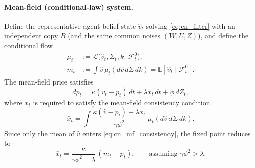 \paragraph{Mean-field (conditional-law) system.}
Define the representative-agent belief state $\hat v_t$ solving \eqref{eq:cn_filter} with an independent copy
$B$ (and the same common noises $(W,U,Z)$), and define the conditional flow
\[
\begin{aligned}
\mu_t &:= \mathcal L\bigl(\hat v_t,\Sigma_t,k \,\big|\, \mathcal F^0_t\bigr),\\
m_t &:= \int \hat v\,\mu_t(d\hat v\,d\Sigma\,dk)=\mathbb E[\hat v_t\mid \mathcal F^0_t].
\end{aligned}
\]
The mean-field price satisfies
\begin{equation}\label{eq:cn_price_limit}
dp_t = \kappa(v_t-p_t)\,dt + \lambda \bar x_t\,dt + \phi\,dZ_t,
\end{equation}
where $\bar x_t$ is required to satisfy the mean-field consistency condition
\begin{equation}\label{eq:cn_mf_consistency}
\bar x_t
= \int \frac{\kappa(\hat v-p_t)+\lambda \bar x_t}{\gamma\phi^2}\ \mu_t(d\hat v\,d\Sigma\,dk).
\end{equation}
Since only the mean of $\hat v$ enters \eqref{eq:cn_mf_consistency}, the fixed point reduces to
\begin{equation}\label{eq:cn_barx_closed}
\bar x_t = \frac{\kappa}{\gamma\phi^2-\lambda}\,(m_t-p_t), \qquad \text{assuming }\gamma\phi^2>\lambda.
\end{equation}


